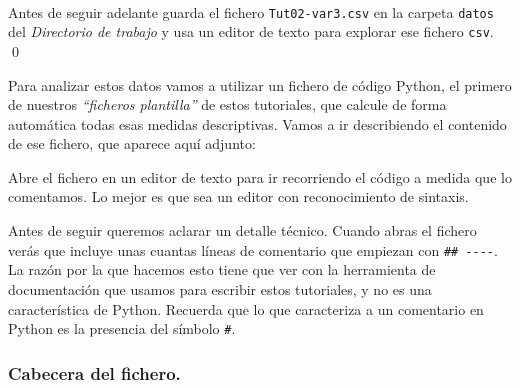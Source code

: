 \documentclass[10pt,a4paper]{article}\usepackage[]{graphicx}\usepackage[]{color}
\newcounter {cont01}
\begin{document}
\begin{ejercicio}
\label{tut02:ejercicio23}
\quad\\
Antes de seguir adelante guarda el fichero {\tt Tut02-var3.csv} en la carpeta {\tt datos} del {\em Directorio de trabajo} y usa un editor de texto para explorar ese fichero {\tt csv}.
\qed
\end{ejercicio}

Para analizar estos datos vamos a utilizar un fichero de código Python, el primero de nuestros {\em ``ficheros plantilla''} de estos tutoriales, que calcule de forma automática todas esas medidas descriptivas. Vamos a ir describiendo el contenido de ese fichero, que aparece aquí adjunto:
\begin{center}
\end{center}
Abre el fichero en un editor de texto para ir recorriendo el código a medida que lo comentamos. Lo mejor es que sea un editor con reconocimiento de sintaxis.

Antes de seguir queremos aclarar un detalle técnico. Cuando abras el fichero verás que incluye unas cuantas líneas de comentario que empiezan con \verb&## ----&. La razón por la que hacemos esto tiene que ver con la herramienta de documentación que usamos para escribir estos tutoriales, y no es una característica de Python. Recuerda que lo que caracteriza a un comentario en Python es la presencia del símbolo \verb&#&.



\subsubsection*{Cabecera del fichero.}
\label{tut02:subsubsec:cabeceraFichero}
\end{document}
